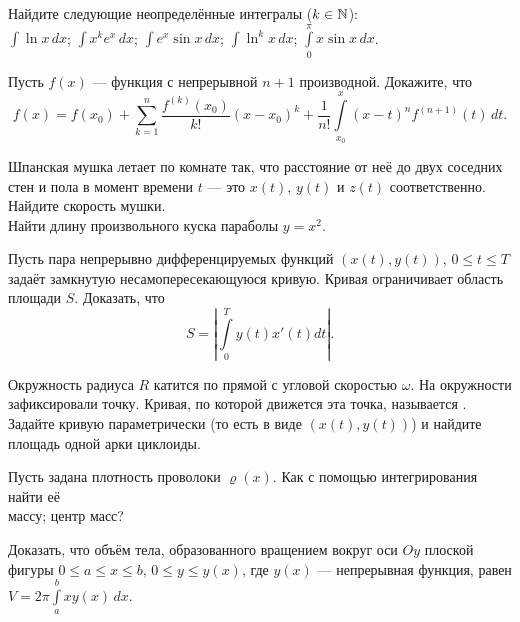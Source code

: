 \documentclass[a4paper,12pt]{article}
\begin{document}
Найдите следующие неопределённые интегралы ($k\in\mathbb{N}$): %
\\
 $\int \ln x \, dx$;
 $\int x^ke^x\, dx$; %
 $\int e^x\sin x \, dx$;
 $\int \ln^k x \, dx$; %
 $\int\limits_0^\pi x\sin x\, dx$.
\vspace*{-3mm}

{}
\newpage

 Пусть $f(x)$ --- функция с непрерывной $n+1$
производной. Докажите, что
\vspace*{-3mm}
$$
f(x)=f(x_0)+\sum_{k=1}^n\frac{f^{(k)}(x_0)}{k!}(x-x_0)^k+
\frac{1}{n!}\int\limits_{x_0}^x(x-t)^nf^{(n+1)}(t)\, dt.
$$
\vspace*{-3mm}




 Шпанская мушка летает по комнате так, что расстояние от неё до двух соседних стен и пола  в момент времени $t$ --- это $x(t)$, $y(t)$ и $z(t)$ соответственно. Найдите скорость мушки.
\\ Найти длину произвольного куска параболы $y=x^2$.

 Пусть пара непрерывно дифференцируемых функций $(x(t),y(t))$, $0\leqslant t \leqslant T$ задаёт замкнутую
несамопересекающуюся кривую. Кривая ограничивает область площади $S$.
Доказать, что
\vspace*{-3mm}
$$
S = \left| \int\limits_0^T y(t) x'(t) dt \right|.
$$
\vspace*{-7mm}


Окружность радиуса $R$ катится по прямой с угловой скоростью $\omega$. На окружности зафиксировали точку. Кривая, по которой движется эта точка, называется . Задайте кривую параметрически (то есть в виде $(x(t),y(t))$) и найдите площадь одной арки циклоиды.

Пусть задана плотность проволоки $\varrho(x)$. Как с помощью интегрирования найти её
\\ массу;  центр масс?

Доказать, что объём тела, образованного вращением вокруг оси $Oy$ плоской фигуры $0 \leqslant a \leqslant x \leqslant b,\, 0\leqslant y \leqslant y(x)$, где $y(x)$
--- непрерывная функция, равен $V = 2 \pi \int\limits_a^b x y(x) \, dx$.
\end{document}
